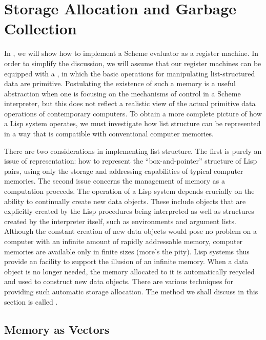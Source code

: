 \section{Storage Allocation and Garbage Collection}
\label{Section 5.3}

In , we will show how to implement a Scheme evaluator as a
register machine.  In order to simplify the discussion, we will assume that our
register machines can be equipped with a , in
which the basic operations for manipulating list-structured data are primitive.
Postulating the existence of such a memory is a useful abstraction when one is
focusing on the mechanisms of control in a Scheme interpreter, but this does
not reflect a realistic view of the actual primitive data operations of
contemporary computers.  To obtain a more complete picture of how a Lisp system
operates, we must investigate how list structure can be represented in a way
that is compatible with conventional computer memories.

There are two considerations in implementing list structure.  The first is
purely an issue of representation: how to represent the ``box-and-pointer''
structure of Lisp pairs, using only the storage and addressing capabilities of
typical computer memories.  The second issue concerns the management of memory
as a computation proceeds.  The operation of a Lisp system depends crucially on
the ability to continually create new data objects.  These include objects that
are explicitly created by the Lisp procedures being interpreted as well as
structures created by the interpreter itself, such as environments and argument
lists.  Although the constant creation of new data objects would pose no
problem on a computer with an infinite amount of rapidly addressable memory,
computer memories are available only in finite sizes (more's the pity).  Lisp
systems thus provide an  facility to
support the illusion of an infinite memory.  When a data object is no longer
needed, the memory allocated to it is automatically recycled and used to
construct new data objects.  There are various techniques for providing such
automatic storage allocation.  The method we shall discuss in this section is
called .



\subsection{Memory as Vectors}
\label{Section 5.3.1}

